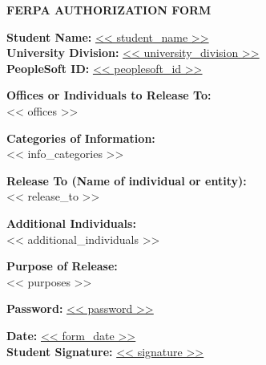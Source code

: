 \documentclass[12pt]{article}
\begin{document}
\begin{center}
    {\Large \textbf{FERPA AUTHORIZATION FORM}}
\end{center}

\vspace{1em}

\textbf{Student Name:} \underline{<< student_name >>} \\
\textbf{University Division:} \underline{<< university_division >>} \\
\textbf{PeopleSoft ID:} \underline{<< peoplesoft_id >>}

\vspace{1em}

\textbf{Offices or Individuals to Release To:} \\
<< offices >>

\vspace{1em}

\textbf{Categories of Information:} \\
<< info_categories >>

\vspace{1em}

\textbf{Release To (Name of individual or entity):} \\
<< release_to >>

\vspace{1em}

\textbf{Additional Individuals:} \\
<< additional_individuals >>

\vspace{1em}

\textbf{Purpose of Release:} \\
<< purposes >>

\vspace{1em}

\textbf{Password:} \underline{<< password >>}

\vspace{1em}

\textbf{Date:} \underline{<< form_date >>} \\
\textbf{Student Signature:} \underline{<< signature >>}
\end{document}
